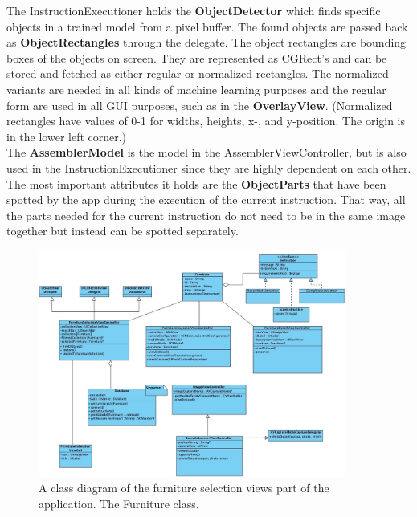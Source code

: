 The InstructionExecutioner holds the \textbf{ObjectDetector} which finds specific objects in a 
trained model from a pixel buffer. The found objects are passed back as \textbf{ObjectRectangles} through the delegate. The object rectangles are bounding boxes
of the objects on screen. They are represented as CGRect's and can be stored and fetched as
either regular or normalized rectangles. The normalized variants are needed in all kinds of machine learning purposes and the regular form are used in all GUI purposes, such as in the \textbf{OverlayView}. (Normalized 
rectangles have values of 0-1 for widths, heights, x-, and y-position. The origin is in the lower left 
corner.)\\

The \textbf{AssemblerModel} is the model in the AssemblerViewController, but is also used in the InstructionExecutioner since they are highly dependent on each other.
The most important attributes it holds are the \textbf{ObjectParts} that have been spotted by the 
app during the execution of the current instruction.
That way, all the parts needed for the current instruction do not need to be in the same image 
together but instead can be spotted separately.\\

\begin{figure}[!hbtp]
\begin{center}
\includegraphics[width = 0.9\textwidth]{./Images/FurnitureClassDiagram.jpg}
\caption{A class diagram of the furniture selection views part of the application. The Furniture class.}
\label{fig:classdiagramassembler}
\end{center}
\end{figure}

